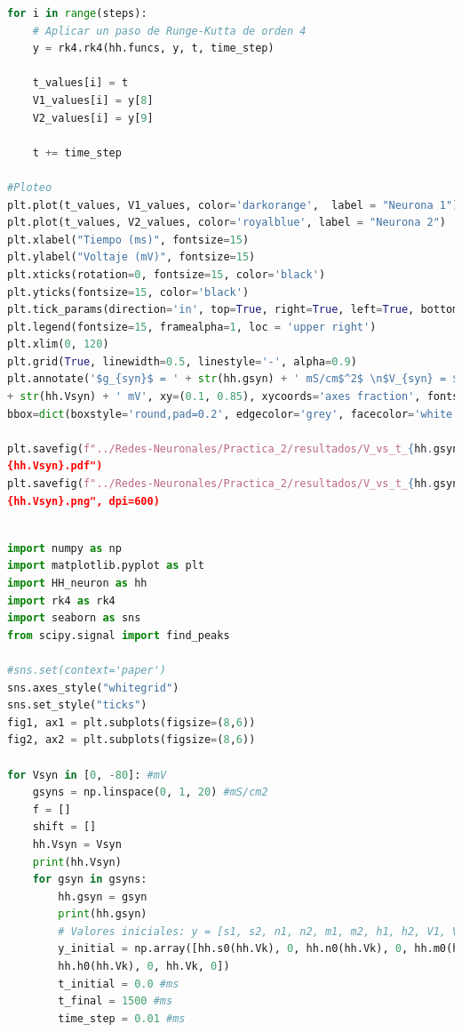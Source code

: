 \documentclass[11pt,twocolumn,twoside]{opticajnl}
\begin{document}
\begin{onecolumn}
\begin{lstlisting}[language=Python, caption={Simulación de una interacción exitatoria o inhibitoria entre dos neuronas de Hodgkin y Huxley para un dado valor de $g_{syn}$.}, label=python-code]
for i in range(steps):
    # Aplicar un paso de Runge-Kutta de orden 4
    y = rk4.rk4(hh.funcs, y, t, time_step)

    t_values[i] = t
    V1_values[i] = y[8]
    V2_values[i] = y[9]
    
    t += time_step

#Ploteo
plt.plot(t_values, V1_values, color='darkorange',  label = "Neurona 1")
plt.plot(t_values, V2_values, color='royalblue', label = "Neurona 2")
plt.xlabel("Tiempo (ms)", fontsize=15)
plt.ylabel("Voltaje (mV)", fontsize=15)
plt.xticks(rotation=0, fontsize=15, color='black')
plt.yticks(fontsize=15, color='black')
plt.tick_params(direction='in', top=True, right=True, left=True, bottom=True)
plt.legend(fontsize=15, framealpha=1, loc = 'upper right')
plt.xlim(0, 120)
plt.grid(True, linewidth=0.5, linestyle='-', alpha=0.9)
plt.annotate('$g_{syn}$ = ' + str(hh.gsyn) + ' mS/cm$^2$ \n$V_{syn} = $' 
+ str(hh.Vsyn) + ' mV', xy=(0.1, 0.85), xycoords='axes fraction', fontsize=12, 
bbox=dict(boxstyle='round,pad=0.2', edgecolor='grey', facecolor='white'))

plt.savefig(f"../Redes-Neuronales/Practica_2/resultados/V_vs_t_{hh.gsyn}_
{hh.Vsyn}.pdf")
plt.savefig(f"../Redes-Neuronales/Practica_2/resultados/V_vs_t_{hh.gsyn}_
{hh.Vsyn}.png", dpi=600)

\end{lstlisting}
    
\begin{lstlisting}[language=Python, caption={Código para calcular el desfasaje entre dos neuronas de Hodgkin y Huxley y la tasa de disparo, para un dado valor de $g_{syn}$} en una interacción exitatoria o inhibitoria , label=python-code]

import numpy as np
import matplotlib.pyplot as plt
import HH_neuron as hh
import rk4 as rk4
import seaborn as sns
from scipy.signal import find_peaks

#sns.set(context='paper')
sns.axes_style("whitegrid")
sns.set_style("ticks")
fig1, ax1 = plt.subplots(figsize=(8,6)) 
fig2, ax2 = plt.subplots(figsize=(8,6)) 

for Vsyn in [0, -80]: #mV
    gsyns = np.linspace(0, 1, 20) #mS/cm2
    f = []
    shift = []
    hh.Vsyn = Vsyn
    print(hh.Vsyn)
    for gsyn in gsyns:
        hh.gsyn = gsyn
        print(hh.gsyn)
        # Valores iniciales: y = [s1, s2, n1, n2, m1, m2, h1, h2, V1, V2]
        y_initial = np.array([hh.s0(hh.Vk), 0, hh.n0(hh.Vk), 0, hh.m0(hh.Vk), 0, 
        hh.h0(hh.Vk), 0, hh.Vk, 0])
        t_initial = 0.0 #ms
        t_final = 1500 #ms
        time_step = 0.01 #ms


\end{lstlisting}
\end{onecolumn}
\end{document}
